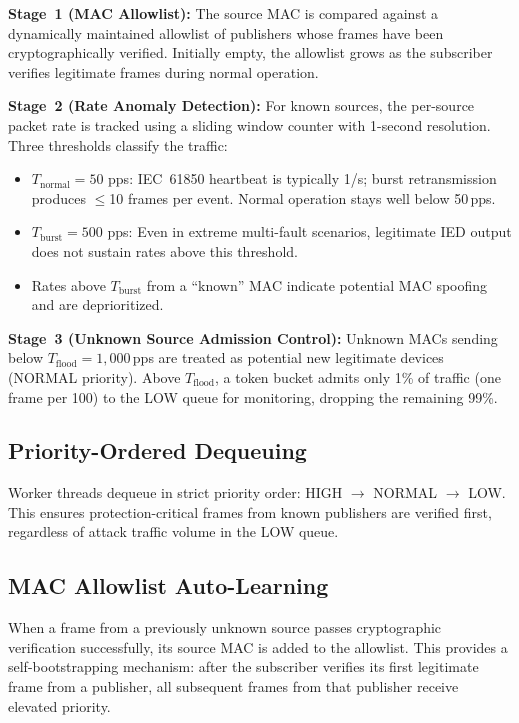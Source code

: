 \documentclass[journal]{IEEEtran}
\begin{document}
\textbf{Stage~1 (MAC Allowlist):} The source MAC is compared against a dynamically maintained allowlist of publishers whose frames have been cryptographically verified. Initially empty, the allowlist grows as the subscriber verifies legitimate frames during normal operation.

\textbf{Stage~2 (Rate Anomaly Detection):} For known sources, the per-source packet rate is tracked using a sliding window counter with 1-second resolution. Three thresholds classify the traffic:
\begin{itemize}[leftmargin=*]
    \item $T_{\text{normal}} = 50$ pps: IEC~61850 heartbeat is typically 1/s; burst retransmission produces $\leq$10 frames per event. Normal operation stays well below 50\,pps.
    \item $T_{\text{burst}} = 500$ pps: Even in extreme multi-fault scenarios, legitimate IED output does not sustain rates above this threshold.
    \item Rates above $T_{\text{burst}}$ from a ``known'' MAC indicate potential MAC spoofing and are deprioritized.
\end{itemize}

\textbf{Stage~3 (Unknown Source Admission Control):} Unknown MACs sending below $T_{\text{flood}} = 1{,}000$\,pps are treated as potential new legitimate devices (NORMAL priority). Above $T_{\text{flood}}$, a token bucket admits only 1\% of traffic (one frame per 100) to the LOW queue for monitoring, dropping the remaining 99\%.

\subsection{Priority-Ordered Dequeuing}
Worker threads dequeue in strict priority order: HIGH $\rightarrow$ NORMAL $\rightarrow$ LOW. This ensures protection-critical frames from known publishers are verified first, regardless of attack traffic volume in the LOW queue.

\subsection{MAC Allowlist Auto-Learning}
When a frame from a previously unknown source passes cryptographic verification successfully, its source MAC is added to the allowlist. This provides a self-bootstrapping mechanism: after the subscriber verifies its first legitimate frame from a publisher, all subsequent frames from that publisher receive elevated priority.
\end{document}
